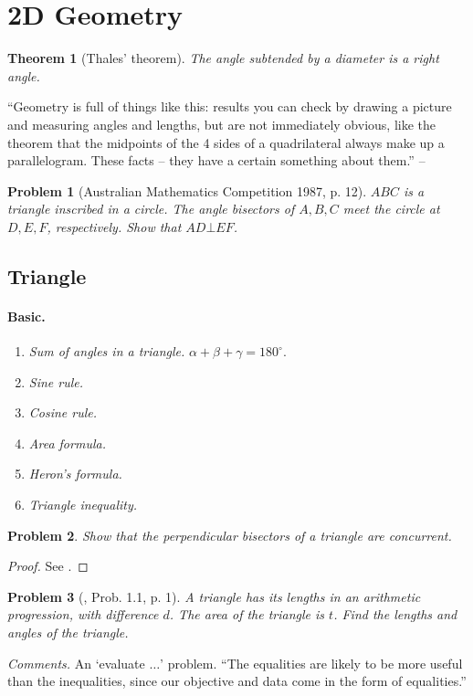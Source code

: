 \documentclass[oneside]{book}
\numberwithin{equation}{section}
\newtheorem{problem}{Problem}[section]
\newtheorem{theorem}{Theorem}[section]
\begin{document}
\section{2D Geometry}
\begin{theorem}[Thales' theorem]
	The angle subtended by a diameter is a right angle.
\end{theorem}
``Geometry is full of things like this: results you can check by drawing a picture and measuring angles and lengths, but are not immediately obvious, like the theorem that the midpoints of the 4 sides of a quadrilateral always make up a parallelogram. These facts -- they have a certain something about them.'' -- \cite[Chap. 4, p. 50]{Tao2006}

\begin{problem}[Australian Mathematics Competition 1987, p. 12]
	$ABC$ is a triangle inscribed in a circle. The angle bisectors of $A,B,C$ meet the circle at $D,E,F$, respectively. Show that $AD\bot EF$.
\end{problem}

\subsection{Triangle}

\paragraph{Basic.}
\begin{enumerate}
	\item \textit{Sum of angles in a triangle.} $\alpha + \beta + \gamma = 180^\circ$.
	\item \textit{Sine rule.}
	\item \textit{Cosine rule.}
	\item \textit{Area formula.}
	\item \textit{Heron's formula.}
	\item \textit{Triangle inequality.}
\end{enumerate}

\begin{problem}
	Show that the perpendicular bisectors of a triangle are concurrent.
\end{problem}

\begin{proof}[Proof]
	See \cite[p. ix]{Tao2006}.
\end{proof}

\begin{problem}[\cite{Tao2006}, Prob. 1.1, p. 1]
	A triangle has its lengths in an arithmetic progression, with difference $d$. The area of the triangle is $t$. Find the lengths and angles of the triangle.
\end{problem}
\textit{Comments.} An `evaluate $\ldots$' problem. ``The equalities are likely to be more useful than the inequalities, since our objective and data come in the form of equalities.''
\end{document}

